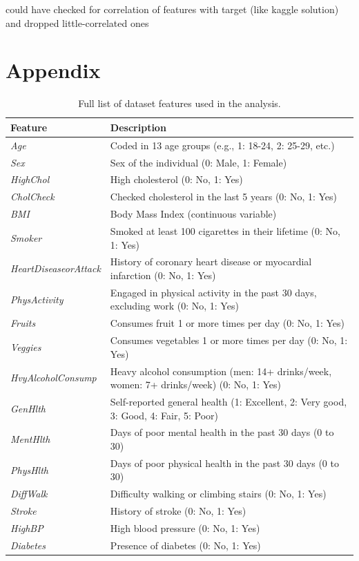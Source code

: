 \documentclass[a4paper,12pt]{article}
\begin{document}
could have checked for correlation of features with target (like kaggle solution) and dropped little-correlated ones

\clearpage

\appendix
\section*{Appendix}

\begin{table}[h!]
    \centering
    \begin{tabularx}{\textwidth}{|l|X|}
    \hline
    \textbf{Feature} & \textbf{Description} \\ \hline
    \textit{Age} & Coded in 13 age groups (e.g., 1: 18-24, 2: 25-29, etc.) \\ \hline
    \textit{Sex} & Sex of the individual (0: Male, 1: Female) \\ \hline
    \textit{HighChol} & High cholesterol (0: No, 1: Yes) \\ \hline
    \textit{CholCheck} & Checked cholesterol in the last 5 years (0: No, 1: Yes) \\ \hline
    \textit{BMI} & Body Mass Index (continuous variable) \\ \hline
    \textit{Smoker} & Smoked at least 100 cigarettes in their lifetime (0: No, 1: Yes) \\ \hline
    \textit{HeartDiseaseorAttack} & History of coronary heart disease or myocardial infarction (0: No, 1: Yes) \\ \hline
    \textit{PhysActivity} & Engaged in physical activity in the past 30 days, excluding work (0: No, 1: Yes) \\ \hline
    \textit{Fruits} & Consumes fruit 1 or more times per day (0: No, 1: Yes) \\ \hline
    \textit{Veggies} & Consumes vegetables 1 or more times per day (0: No, 1: Yes) \\ \hline
    \textit{HvyAlcoholConsump} & Heavy alcohol consumption (men: 14+ drinks/week, women: 7+ drinks/week) (0: No, 1: Yes) \\ \hline
    \textit{GenHlth} & Self-reported general health (1: Excellent, 2: Very good, 3: Good, 4: Fair, 5: Poor) \\ \hline
    \textit{MentHlth} & Days of poor mental health in the past 30 days (0 to 30) \\ \hline
    \textit{PhysHlth} & Days of poor physical health in the past 30 days (0 to 30) \\ \hline
    \textit{DiffWalk} & Difficulty walking or climbing stairs (0: No, 1: Yes) \\ \hline
    \textit{Stroke} & History of stroke (0: No, 1: Yes) \\ \hline
    \textit{HighBP} & High blood pressure (0: No, 1: Yes) \\ \hline
    \textit{Diabetes} & Presence of diabetes (0: No, 1: Yes) \\ \hline
    \end{tabularx}
    \caption{Full list of dataset features used in the analysis.}
    \label{tab:feature_list}
\end{table}

\printbibliography
\end{document}
